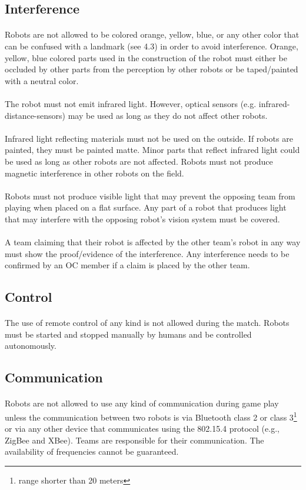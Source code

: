 \documentclass{article}
\newcommand*{\p}{\paragraph{}}
\begin{document}
\subsection{ Interference \label{ref-interference}}

\p Robots are not allowed to be colored orange, yellow, blue, or any other
color that can be confused with a landmark (see 4.3) in order to avoid
interference.  Orange, yellow, blue colored parts used in the construction of
the robot must either be occluded by other parts from the perception by other
robots or be taped/painted with a neutral color.

\p The robot must not emit infrared light. However, optical sensors (e.g.
infrared-distance-sensors) may be used as long as they do not affect other
robots.

\p Infrared light reflecting materials must not be used on the outside. If robots
are painted, they must be painted matte. Minor parts that reflect infrared
light could be used as long as other robots are not affected. Robots must not
produce magnetic interference in other robots on the field.

\p Robots must not produce visible light that may prevent the opposing team
from playing when placed on a flat surface. Any part of a robot that produces
light that may interfere with the opposing robot's vision system must be
covered.

\p A team claiming that their robot is affected by the other team's robot in
any way must show the proof/evidence of the interference. Any interference
needs to be confirmed by an OC member if a claim is placed by the other team.

\subsection{ Control \label{ref-control}}

\p The use of remote control of any kind is not allowed during the match. Robots
must be started and stopped manually by humans and be controlled autonomously.

\subsection{ Communication \label{ref-022}}

\p Robots are not allowed to use any kind of communication during game play unless
the communication between two robots is via Bluetooth class 2 or class
3\footnote{range shorter than 20 meters} or via any other device that
communicates using the 802.15.4 protocol (e.g., ZigBee and XBee). Teams are
responsible for their communication. The availability of frequencies cannot be
guaranteed.
\end{document}
